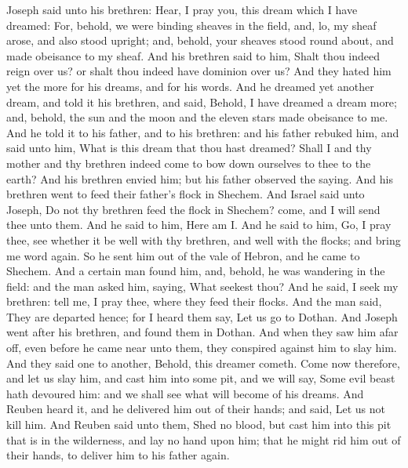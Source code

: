  Joseph said unto his brethren: Hear, I pray you, this dream which I have dreamed: For, behold, we were binding sheaves in the field, and, lo, my sheaf arose, and also stood upright; and, behold, your sheaves stood round about, and made obeisance to my sheaf. And his brethren said to him, Shalt thou indeed reign over us? or shalt thou indeed have dominion over us? And they hated him yet the more for his dreams, and for his words. And he dreamed yet another dream, and told it his brethren, and said, Behold, I have dreamed a dream more; and, behold, the sun and the moon and the eleven stars made obeisance to me. And he told it to his father, and to his brethren: and his father rebuked him, and said unto him, What is this dream that thou hast dreamed? Shall I and thy mother and thy brethren indeed come to bow down ourselves to thee to the earth? And his brethren envied him; but his father observed the saying. And his brethren went to feed their father's flock in Shechem. And Israel said unto Joseph, Do not thy brethren feed the flock in Shechem? come, and I will send thee unto them. And he said to him, Here am I. And he said to him, Go, I pray thee, see whether it be well with thy brethren, and well with the flocks; and bring me word again. So he sent him out of the vale of Hebron, and he came to Shechem. And a certain man found him, and, behold, he was wandering in the field: and the man asked him, saying, What seekest thou? And he said, I seek my brethren: tell me, I pray thee, where they feed their flocks. And the man said, They are departed hence; for I heard them say, Let us go to Dothan. And Joseph went after his brethren, and found them in Dothan. And when they saw him afar off, even before he came near unto them, they conspired against him to slay him. And they said one to another, Behold, this dreamer cometh. Come now therefore, and let us slay him, and cast him into some pit, and we will say, Some evil beast hath devoured him: and we shall see what will become of his dreams. And Reuben heard it, and he delivered him out of their hands; and said, Let us not kill him. And Reuben said unto them, Shed no blood, but cast him into this pit that is in the wilderness, and lay no hand upon him; that he might rid him out of their hands, to deliver him to his father again.



